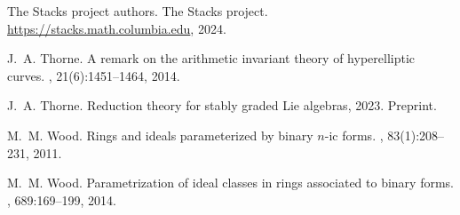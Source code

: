 \documentclass{article} %
\numberwithin{equation}{section}
\begin{document}
\begin{thebibliography}{10}
{The Stacks project authors}.
\newblock The {S}tacks project.
\newblock \url{https://stacks.math.columbia.edu}, 2024.

J.~A. Thorne.
\newblock A remark on the arithmetic invariant theory of hyperelliptic curves.
, 21(6):1451--1464, 2014.

J.~A. Thorne.
\newblock Reduction theory for stably graded {L}ie algebras, 2023.
\newblock Preprint.

M.~M. Wood.
\newblock Rings and ideals parameterized by binary {$n$}-ic forms.
, 83(1):208--231, 2011.

M.~M. Wood.
\newblock Parametrization of ideal classes in rings associated to binary forms.
, 689:169--199, 2014.

\end{thebibliography}
\end{document}
